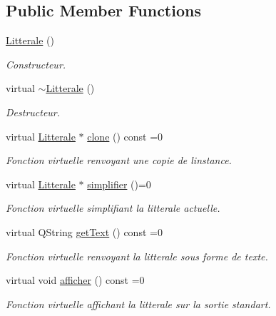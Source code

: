 \subsection*{Public Member Functions}
\begin{DoxyCompactItemize}
\item 
\hyperlink{class_litterale_aa0a02717ec75f502f1afdb6ac597efac}{Litterale} ()\hypertarget{class_litterale_aa0a02717ec75f502f1afdb6ac597efac}{}\label{class_litterale_aa0a02717ec75f502f1afdb6ac597efac}

\begin{DoxyCompactList}\small\item\em Constructeur. \end{DoxyCompactList}\item 
virtual \hyperlink{class_litterale_abd6b3faa8cda262bb5fab57e1e323090}{$\sim$\+Litterale} ()\hypertarget{class_litterale_abd6b3faa8cda262bb5fab57e1e323090}{}\label{class_litterale_abd6b3faa8cda262bb5fab57e1e323090}

\begin{DoxyCompactList}\small\item\em Destructeur. \end{DoxyCompactList}\item 
virtual \hyperlink{class_litterale}{Litterale} $\ast$ \hyperlink{class_litterale_a08967178d22c3d69e6c3e86ea8c85888}{clone} () const  =0
\begin{DoxyCompactList}\small\item\em Fonction virtuelle renvoyant une copie de l\textquotesingle{}instance. \end{DoxyCompactList}\item 
virtual \hyperlink{class_litterale}{Litterale} $\ast$ \hyperlink{class_litterale_af33a0c1a4a9a5bb687da112b12f0e6e6}{simplifier} ()=0
\begin{DoxyCompactList}\small\item\em Fonction virtuelle simplifiant la litterale actuelle. \end{DoxyCompactList}\item 
virtual Q\+String \hyperlink{class_litterale_a780075c00abf31efb87e7c28843ea029}{get\+Text} () const  =0
\begin{DoxyCompactList}\small\item\em Fonction virtuelle renvoyant la litterale sous forme de texte. \end{DoxyCompactList}\item 
virtual void \hyperlink{class_litterale_aa63aae17689258434f4a1319b7371571}{afficher} () const  =0\hypertarget{class_litterale_aa63aae17689258434f4a1319b7371571}{}\label{class_litterale_aa63aae17689258434f4a1319b7371571}

\begin{DoxyCompactList}\small\item\em Fonction virtuelle affichant la litterale sur la sortie standart. \end{DoxyCompactList}\end{DoxyCompactItemize}


